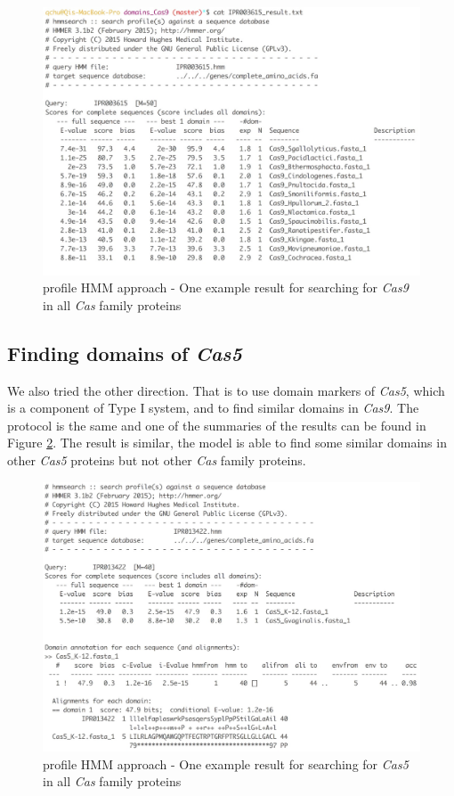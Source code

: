\documentclass[11pt, oneside]{article}
\begin{document}
\begin{figure}[ht]
  \centering
  \includegraphics[scale = 0.3]{images/cas9Domain}
      \caption{profile HMM approach - One example result for searching for \textit{Cas9} in all \textit{Cas} family proteins}
      \label{Cas9}
\end{figure} 

\subsection{Finding domains of \textit{Cas5}}

We also tried the other direction. That is to use domain markers of \textit{Cas5}, which is a component of Type I system, and to find similar domains in \textit{Cas9}. The protocol is the same and one of the summaries of the results can be found in Figure \ref{Cas5}. The result is similar, the model is able to find some similar domains in other \textit{Cas5} proteins but not other \textit{Cas} family proteins.

\begin{figure}[ht]
  \centering
  \includegraphics[scale = 0.3]{images/cas5Domain}
      \caption{profile HMM approach - One example result for searching for \textit{Cas5} in all \textit{Cas} family proteins}
      \label{Cas5}
\end{figure} 
\end{document}
